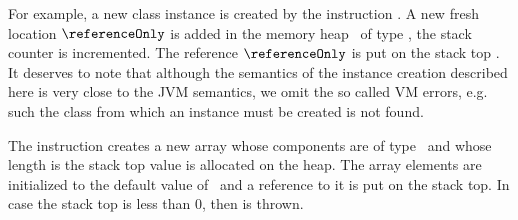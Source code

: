  For example, a new class instance
is created by the instruction \new.  A new fresh location $\referenceOnly$ is added in the memory heap 
\heap \ of type  \clazz, the  stack counter \counterOnly is incremented. The reference $\referenceOnly$ 
is put on the stack  top . It deserves to note that although the semantics of the instance creation
 described here  is very close to the JVM semantics, we omit the so called VM errors, e.g. such the class from which an
 instance must be created is not found.    

The instruction \newarray{} creates a new array whose components are of type \anyType \ and whose length is the stack top value is allocated on the heap.
The array elements are initialized to the default value of  \anyType \ and a reference to it is put on the stack top. 
In case the stack top is less than 0, then \NegativeArraySizeExc{} is thrown.

